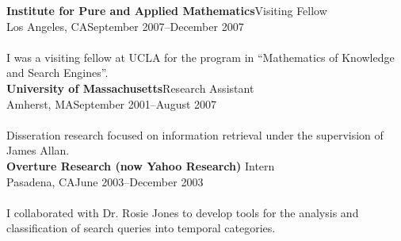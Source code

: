\documentclass{article}
\begin{document}
\noindent\textbf{Institute for Pure and Applied Mathematics}\hfill Visiting Fellow\\
Los Angeles, CA\hfill September 2007–December 2007\\\\
I was a visiting fellow at UCLA for the program in ``Mathematics of Knowledge and Search Engines''.\\

\noindent\textbf{University of Massachusetts}\hfill Research Assistant\\
Amherst, MA\hfill  September 2001–August 2007\\\\
Disseration research focused on information retrieval under the supervision of James Allan.\\
%


\noindent\textbf{Overture Research (now Yahoo Research) }\hfill Intern\\
Pasadena, CA\hfill  June 2003–December 2003\\\\
I collaborated with Dr. Rosie Jones to develop tools for the analysis and classification of search queries into temporal categories. \\%
\end{document}
